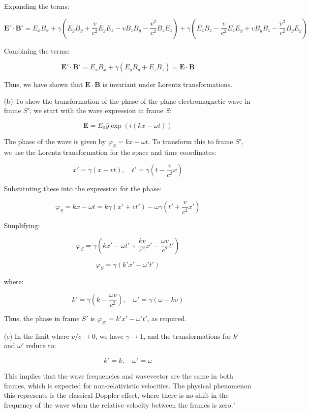 Expanding the terms:

\[
\mathbf{E'} \cdot \mathbf{B'} = E_x B_x + \gamma \left( E_y B_y + \frac{v}{c^2} E_y E_z - v B_z B_y - \frac{v^2}{c^2} B_z E_z \right)
+ \gamma \left( E_z B_z - \frac{v}{c^2} E_z E_y + v B_y B_z - \frac{v^2}{c^2} B_y E_y \right)
\]

Combining the terms:

\[
\mathbf{E'} \cdot \mathbf{B'} = E_x B_x + \gamma \left( E_y B_y + E_z B_z \right)
= \mathbf{E} \cdot \mathbf{B}
\]

Thus, we have shown that \( \mathbf{E} \cdot \mathbf{B} \) is invariant under Lorentz transformations.

(b) To show the transformation of the phase of the plane electromagnetic wave in frame \( S' \), we start with the wave expression in frame \( S \):

\[
\mathbf{E} = E_0 \hat{y} \exp \left( i(kx - \omega t) \right)
\]

The phase of the wave is given by \( \varphi_S = kx - \omega t \). To transform this to frame \( S' \), we use the Lorentz transformation for the space and time coordinates:

\[
x' = \gamma (x - vt), \quad t' = \gamma \left( t - \frac{v}{c^2} x \right)
\]

Substituting these into the expression for the phase:

\[
\varphi_S = kx - \omega t = k \gamma (x' + vt') - \omega \gamma \left( t' + \frac{v}{c^2} x' \right)
\]

Simplifying:

\[
\varphi_S = \gamma \left( kx' - \omega t' + \frac{kv}{c^2} x' - \frac{\omega v}{c^2} t' \right)
\]

\[
\varphi_S = \gamma \left( k' x' - \omega' t' \right)
\]

where:

\[
k' = \gamma \left( k - \frac{\omega v}{c^2} \right), \quad \omega' = \gamma (\omega - kv)
\]

Thus, the phase in frame \( S' \) is \( \varphi_{S'} = k'x' - \omega' t' \), as required.

(c) In the limit where \( v / c \to 0 \), we have \( \gamma \to 1 \), and the transformations for \( k' \) and \( \omega' \) reduce to:

\[
k' = k, \quad \omega' = \omega
\]

This implies that the wave frequencies and wavevector are the same in both frames, which is expected for non-relativistic velocities. The physical phenomenon this represents is the classical Doppler effect, where there is no shift in the frequency of the wave when the relative velocity between the frames is zero."

